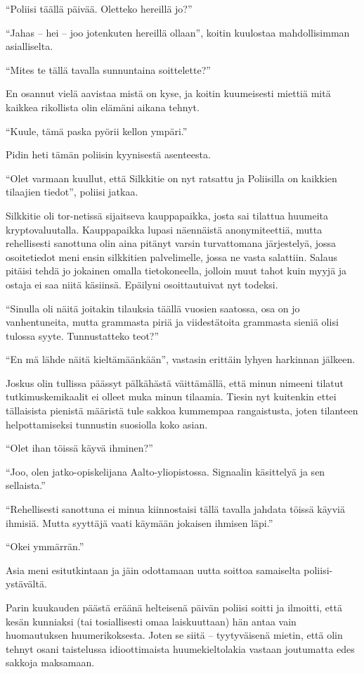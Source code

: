 \documentclass{tsnovel}
\begin{document}
``Poliisi täällä päivää. Oletteko hereillä jo?''

``Jahas – hei – joo jotenkuten hereillä ollaan'', koitin kuulostaa mahdollisimman asialliselta.

``Mites te tällä tavalla sunnuntaina soittelette?''

En osannut vielä aavistaa mistä on kyse, ja koitin kuumeisesti miettiä mitä kaikkea rikollista olin elämäni aikana tehnyt.

``Kuule, tämä paska pyörii kellon ympäri.''

Pidin heti tämän poliisin kyynisestä asenteesta.

``Olet varmaan kuullut, että Silkkitie on nyt ratsattu ja Poliisilla on kaikkien tilaajien tiedot'', poliisi jatkaa.

Silkkitie oli tor-netissä sijaitseva kauppapaikka, josta sai tilattua huumeita kryptovaluutalla. Kauppapaikka lupasi näennäistä anonymiteettiä, mutta rehellisesti sanottuna olin aina pitänyt varsin turvattomana järjestelyä, jossa osoitetiedot meni ensin silkkitien palvelimelle, jossa ne vasta salattiin. Salaus pitäisi tehdä jo jokainen omalla tietokoneella, jolloin muut tahot kuin myyjä ja ostaja  ei saa niitä käsiinsä. Epäilyni osoittautuivat nyt todeksi.

``Sinulla oli näitä joitakin tilauksia täällä vuosien saatossa, osa on jo vanhentuneita, mutta grammasta piriä ja viidestätoita grammasta sieniä olisi tulossa syyte. Tunnustatteko teot?''

``En mä lähde näitä kieltämäänkään'', vastasin erittäin lyhyen harkinnan jälkeen.

Joskus olin tullissa päässyt pälkähästä väittämällä, että minun nimeeni tilatut tutkimuskemikaalit ei olleet muka minun tilaamia. Tiesin nyt kuitenkin ettei tällaisista pienistä määristä tule sakkoa kummempaa rangaistusta, joten tilanteen helpottamiseksi tunnustin suosiolla koko asian.

``Olet ihan töissä käyvä ihminen?''

``Joo, olen jatko-opiskelijana Aalto-yliopistossa. Signaalin käsittelyä ja sen sellaista.''

``Rehellisesti sanottuna ei minua kiinnostaisi tällä tavalla jahdata töissä käyviä ihmisiä. Mutta syyttäjä vaati käymään jokaisen ihmisen läpi.''

``Okei ymmärrän.''

Asia meni esitutkintaan ja jäin odottamaan uutta soittoa samaiselta poliisi-ystävältä.


Parin kuukauden päästä eräänä helteisenä päivän poliisi soitti ja ilmoitti, että kesän kunniaksi (tai tosiallisesti omaa laiskuuttaan) hän antaa vain huomautuksen huumerikoksesta. Joten se siitä – tyytyväisenä mietin, että olin tehnyt osani taistelussa idioottimaista huumekieltolakia vastaan joutumatta edes sakkoja maksamaan.
\end{document}
